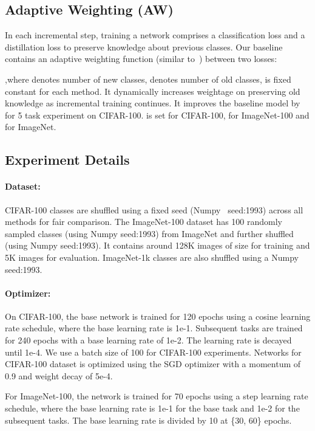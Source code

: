 \documentclass[final]{cvpr}
\begin{document}
\subsection{Adaptive Weighting (AW)}

In each incremental step, training a network comprises a classification loss and a distillation loss to preserve knowledge about previous classes. Our baseline contains an adaptive weighting function  (similar to~\cite{lucir}) between two losses:  


,where  denotes number of new classes,  denotes number of old classes,  is fixed constant for each method. It dynamically increases weightage on preserving old knowledge as incremental training continues. It improves the baseline model by  for 5 task experiment on CIFAR-100.  is set for CIFAR-100,  for ImageNet-100 and  for ImageNet.  




\subsection{Experiment Details}

\paragraph{Dataset:}
CIFAR-100 classes are shuffled using a fixed seed (Numpy~\cite{5725236} seed:1993) across all methods for fair comparison.
The ImageNet-100 dataset has 100 randomly sampled classes (using Numpy seed:1993) from ImageNet and further shuffled (using Numpy seed:1993). It  contains around 128K images of size  for training and 5K images for evaluation. ImageNet-1k classes are also shuffled using a Numpy seed:1993. 

\paragraph{Optimizer:} On CIFAR-100, the base network is trained for 120 epochs using a cosine learning rate schedule, where the base learning rate is 1e-1. Subsequent  tasks are trained for 240 epochs with a base learning rate of 1e-2.
The learning rate is decayed until 1e-4. We use a batch size of 100 for CIFAR-100 experiments.
Networks for CIFAR-100 dataset is optimized using the SGD optimizer with a momentum of 0.9 and weight decay of 5e-4. 

For ImageNet-100, the network is trained for 70 epochs using a step learning rate schedule, where the base learning rate is 1e-1 for the base task and 1e-2 for the subsequent  tasks. The base learning rate is divided by 10 at \{30, 60\} epochs. 
\end{document}
